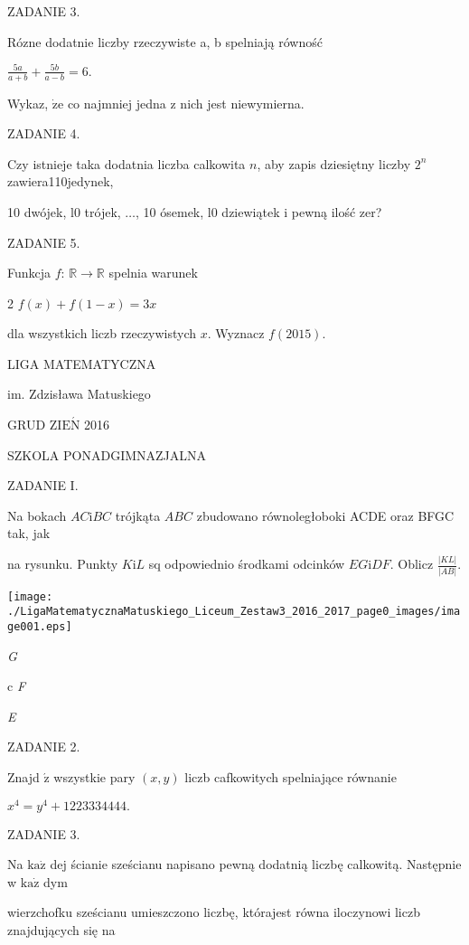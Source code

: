 \documentclass[a4paper,12pt]{article}
\begin{document}
ZADANIE 3.

Rózne dodatnie liczby rzeczywiste a, b spelniają równość

$\displaystyle \frac{5a}{a+b}+\frac{5b}{a-b}=6.$

Wykaz, $\dot{\mathrm{z}}\mathrm{e}$ co najmniej jedna z nich jest niewymierna.

ZADANIE 4.

Czy istnieje taka dodatnia liczba calkowita $n$, aby zapis dziesiętny liczby $2^{n}$ zawiera110jedynek,

10 dwójek, l0 trójek, $\ldots$, 10 ósemek, l0 dziewiątek i pewną ilość zer?

ZADANIE 5.

Funkcja $f$: $\mathbb{R}\rightarrow \mathbb{R}$ spelnia warunek

2 $f(x)+f(1-x)=3x$

dla wszystkich liczb rzeczywistych $x$. Wyznacz $f(2015).$






LIGA MATEMATYCZNA

im. Zdzisława Matuskiego

GRUD Z$\mathrm{I}\mathrm{E}\acute{\mathrm{N}}$ 2016

SZKOLA PONADGIMNAZJALNA

ZADANIE I.

Na bokach $AC\mathrm{i}BC$ trójkąta $ABC$ zbudowano równoległoboki ACDE oraz BFGC tak, jak

na rysunku. Punkty $K\mathrm{i}L$ sq odpowiednio środkami odcinków $EG\mathrm{i}DF$. Oblicz $\displaystyle \frac{|KL|}{|AB|}.$
\begin{center}
\texttt{[image: ./LigaMatematycznaMatuskiego\_Liceum\_Zestaw3\_2016\_2017\_page0\_images/image001.eps]}
\end{center}
{\it G}

c  {\it F}

{\it E}

ZADANIE 2.

Znajd $\acute{\mathrm{z}}$ wszystkie pary $(x,y)$ liczb cafkowitych spelniające równanie

$x^{4}=y^{4}+1223334444.$

ZADANIE 3.

Na $\mathrm{k}\mathrm{a}\dot{\mathrm{z}}$ dej ścianie sześcianu napisano pewną dodatnią liczbę calkowitą. Następnie w $\mathrm{k}\mathrm{a}\dot{\mathrm{z}}$ dym

wierzchofku sześcianu umieszczono liczbę, którajest równa iloczynowi liczb znajdujących się na
\end{document}
